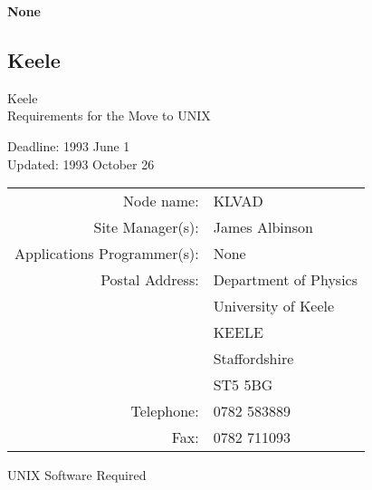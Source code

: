 {\bf None}


\newpage
\subsection{Keele}

\renewcommand{\starsitename}{Keele}
\renewcommand{\starnodename}{KLVAD}

\renewcommand{\starunixdate}{1993 June 1}
\renewcommand{\starupdate}{1993 October 26}

\renewcommand{\starsitetelephone}{0782 583889}
\renewcommand{\starsitefax}{0782 711093}

\begin{center}
{\Large\sc \starsitename \\ [2ex]
           Requirements for the Move to UNIX}

\vspace{3mm}
{\large\sc Deadline: \starunixdate \\ [1ex]
           Updated: \starupdate}
\end{center}

\vspace{5mm}

\begin{center}
\begin{tabular}{rl}
{\sc Node name:}                  & \starnodename \\
{\sc Site Manager(s):}            & James Albinson \\
{\sc Applications Programmer(s):} & None \\
{\sc Postal Address:}             & Department of Physics \\
                                  & University of Keele \\
                                  & KEELE \\
                                  & Staffordshire \\
                                  & ST5 5BG \\
{\sc Telephone:}                  & \starsitetelephone \\
{\sc Fax:}                        & \starsitefax \\
\end{tabular}
\end{center}

\vspace{5mm}
\begin{center}
{\large\sc UNIX Software Required}
\end{center}

